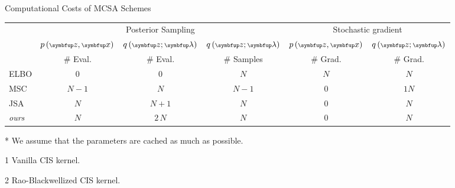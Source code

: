 
\caption{Computational Costs of MCSA Schemes}\label{table:cost}
\setlength{\tabcolsep}{1pt}
  \begin{threeparttable}
\begin{tabular}{lccccc}\toprule
& \multicolumn{3}{c}{\footnotesize Posterior Sampling} & \multicolumn{2}{c}{\footnotesize Stochastic gradient} \\
\cmidrule(lr){2-4}\cmidrule(lr){5-6}
  & \(\scriptsize p\left( \vz, \vx \right)\)
  & \(\scriptsize q\left(\vz; \vlambda\right)\)
  & \(\scriptsize q\left(\vz; \vlambda\right)\)
  & \(\scriptsize p\left( \vz, \vx \right)\)
  & \(\scriptsize q\left(\vz; \vlambda\right)\)
  \\
  & {\scriptsize\# Eval.  }
  & {\scriptsize\# Eval.  }
  & {\scriptsize\# Samples}
  & {\scriptsize\# Grad.  }
  & {\scriptsize\# Grad.  }
%
\\\midrule
%
{\footnotesize
ELBO
}
& \(0\)
& \(0\)
& \(N\)
& \(N\)
& \(N\)
\\\arrayrulecolor{black!30}\midrule
%
{\footnotesize
MSC
}
& \(N-1\)
& \(N\)
& \(N-1\)
& \(0\)
& \(1\)\tnote{1}\;\;{\footnotesize or}\;\(N\)\tnote{2}
\\
%
{\footnotesize
JSA
}
& \(N\)
& \(N+1\)
& \(N\)
& \(0\)
& \(N\)
\\
%
{\footnotesize
\textit{ours}
}
& \(N\)
& \(2 \, N\)
& \(N\)
& \(0\)
& \(N\)
\\\bottomrule
\end{tabular}
  \begin{tablenotes}
    \item[*]{\footnotesize We assume that the parameters are cached as much as possible}.
    \item[1]{\footnotesize Vanilla CIS kernel}.
    \item[2]{\footnotesize Rao-Blackwellized CIS kernel}.
  \end{tablenotes}
  \end{threeparttable}
